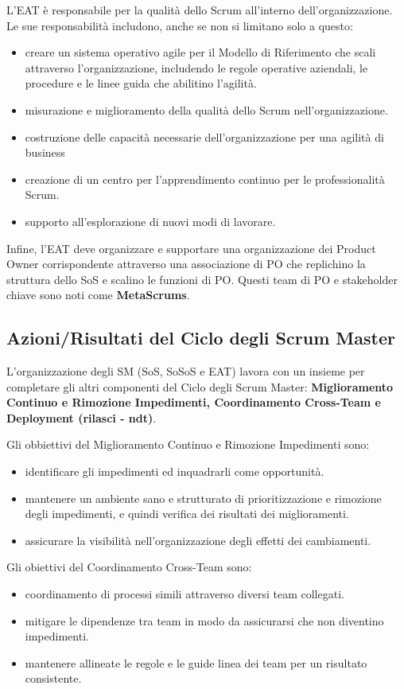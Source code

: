 \documentclass[12pt,a4paper,parskip=full]{scrartcl}
\begin{document}
L'EAT è responsabile per la qualità dello Scrum all'interno dell'organizzazione.
Le sue responsabilità includono, anche se non si limitano solo a questo:
\begin{itemize}
\item creare un sistema operativo agile per il Modello di Riferimento che scali attraverso l'organizzazione, includendo le regole operative aziendali, le procedure e le linee guida che abilitino l'agilità.
\item misurazione e miglioramento della qualità dello Scrum nell'organizzazione.
\item costruzione delle capacità necessarie dell'organizzazione per una agilità di business 
\item creazione di un centro per l'apprendimento continuo per le professionalità Scrum.
\item supporto all'esplorazione di nuovi modi di lavorare.
\end{itemize}
Infine, l'EAT deve organizzare e supportare una organizzazione dei Product Owner corrispondente attraverso una associazione di PO che replichino la struttura dello SoS e scalino le funzioni di PO. Questi team di PO e stakeholder chiave sono noti come  \textbf{MetaScrums}.

\subsection{Azioni/Risultati del Ciclo degli Scrum Master}
L'organizzazione degli SM (SoS, SoSoS e EAT) lavora con un insieme per completare gli altri componenti del Ciclo degli Scrum Master: \textbf{Miglioramento Continuo e
 Rimozione Impedimenti, Coordinamento Cross-Team e Deployment (rilasci - ndt)}.

Gli obbiettivi del Miglioramento Continuo e Rimozione Impedimenti sono:
\begin{itemize}
\item identificare gli impedimenti ed inquadrarli come opportunità.
\item mantenere un ambiente sano e strutturato di prioritizzazione e rimozione degli impedimenti, e quindi verifica dei risultati dei miglioramenti.
\item assicurare la visibilità nell'organizzazione degli effetti dei cambiamenti.
\end{itemize}

Gli obiettivi del Coordinamento Cross-Team sono:
\begin{itemize}
\item coordinamento di processi simili attraverso diversi team collegati.
\item mitigare le dipendenze tra team in modo da assicurarsi che non diventino impedimenti.
\item mantenere allineate le regole e le guide linea dei team per un risultato consistente.
\end{itemize}
\end{document}
